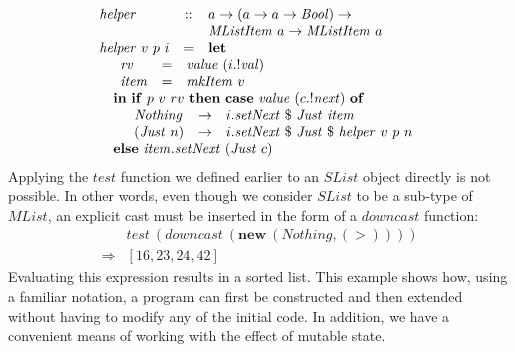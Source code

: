 \begin{displaymath}
\begin{array}{lcl}
\mathit{helper} & :: &  a \to (a \to a \to \mathit{Bool}) \to \\
& & \mathit{MListItem}~a \to \mathit{MListItem}~a \\
\mathit{helper}~v~p~i & = & \mathbf{let} \\
\multicolumn{3}{l}{\quad \begin{array}{lcl}
    \mathit{rv} & = & \mathit{value}~(i.!\mathit{val}) \\
    \mathit{item} & = & \mathit{mkItem}~v
    \end{array}}\\
\multicolumn{3}{l}{\quad \mathbf{in}~\mathbf{if}~p~v~rv~\mathbf{then}~\mathbf{case}~\mathit{value}~(c.!\mathit{next})~\mathbf{of}} \\
\multicolumn{3}{l}{\quad \quad \begin{array}{lcl}
    \mathit{Nothing} & \to & i.\mathit{setNext}~\$~\mathit{Just}~\mathit{item} \\
    (\mathit{Just}~n) & \to & i.\mathit{setNext}~\$~\mathit{Just}~\$~\mathit{helper}~v~p~n 
    \end{array}} \\
\multicolumn{3}{l}{\quad \mathbf{else}~\mathit{item}.\mathit{setNext}~(\mathit{Just}~c)}
\end{array}
\end{displaymath}
Applying the $\mathit{test}$ function we defined earlier to an $\mathit{SList}$ object directly is not possible. In other words, even though we consider $\mathit{SList}$ to be a sub-type of $\mathit{MList}$, an explicit cast must be inserted in the form of a $\mathit{downcast}$ function:
\begin{displaymath}
\begin{array}{cl}
& \mathit{test}~(\mathit{downcast}~(\mathbf{new}~(\mathit{Nothing},(>)))) \\
\Rightarrow & [16,23,24,42]
\end{array}
\end{displaymath}   
Evaluating this expression results in a sorted list. This example shows how, using a familiar notation, a program can first be constructed and then extended without having to modify any of the initial code. In addition, we have a convenient means of working with the effect of mutable state.

